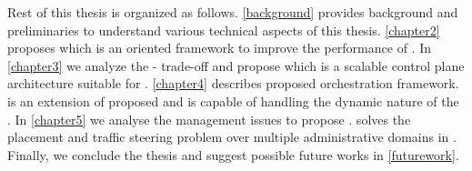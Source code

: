 Rest of this thesis is organized as follows. \cref{background} provides background and preliminaries to understand various technical aspects of this thesis. \cref{chapter2} proposes  which is an  oriented framework to improve the performance of . In \cref{chapter3} we analyze the - trade-off and propose  which is a scalable control plane architecture suitable for . \cref{chapter4} describes proposed  orchestration framework.  is an extension of proposed  and is capable of handling the dynamic nature of the .
 In \cref{chapter5} we analyse the  management issues to propose .  solves the  placement and traffic steering problem over multiple administrative domains in . Finally, we conclude the thesis and suggest possible future works in \cref{futurework}.
